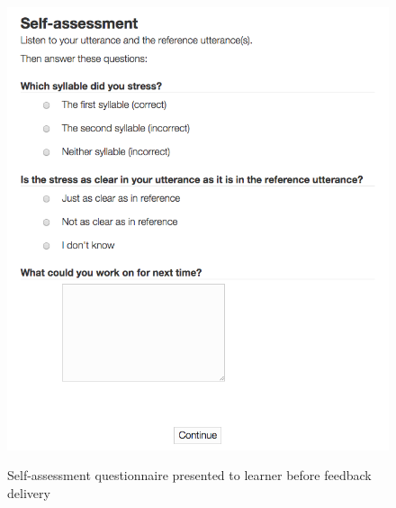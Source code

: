  	
 	\begin{figure}
		\centering
		\caption{Self-assessment questionnaire presented to learner before feedback delivery}
		\includegraphics[width=\textwidth]{img/screenshots/selfAssessment}
		\label{fig:selfassess}
	\end{figure}
		
		
		
%	
%


















